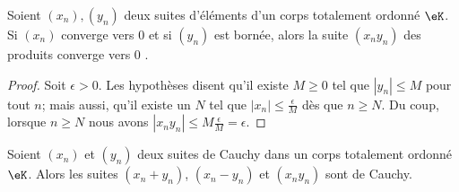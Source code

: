 \begin{proposition}\label{PROPSuiteEcraseTimesBornee}
  Soient \( (x_n), (y_n) \) deux suites d'éléments d'un corps totalement ordonné \( \eK \). Si \( (x_n) \) converge vers \( 0\) et si \( (y_n)\) est bornée, alors la suite \( (x_ny_n) \) des produits converge vers \(0\)  .
\end{proposition}

\begin{proof}
     Soit \(\epsilon>0\). Les hypothèses disent qu'il existe \( M\geq 0\) tel que \( | y_n |\leq M\) pour tout \( n\); mais aussi, qu'il existe un \( N\) tel que \( | x_n |\leq \frac \epsilon M \) dès que \( n\geq N\). Du coup, lorsque \( n\geq N\) nous avons \( | x_ny_n |\leq M\frac \epsilon M = \epsilon \).
\end{proof}

\begin{proposition}\label{PROPCauchyKetOperations}
   Soient \( (x_n)\) et \( (y_n)\) deux suites de Cauchy dans un corps totalement ordonné \( \eK \). Alors les suites \( (x_n+y_n)\), \( (x_n-y_n)\) et \( (x_ny_n)\) sont de Cauchy.
\end{proposition}

